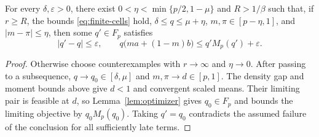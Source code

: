\begin{lemma}\label{lem:finite-approximation}
For every $\delta,\varepsilon>0$, there exist
$0<\eta<\min\{p/2,1-\mu\}$ and $R>1/\beta$ such
that, if $r\ge R$, the bounds \eqref{eq:finite-cells} hold,
$\delta\le q\le\mu+\eta$, $m,\pi\in[p-\eta,1]$, and
$|m-\pi|\le\eta$, then some $q'\in F_p$ satisfies
\[
 |q'-q|\le\varepsilon,\qquad
 q\bigl(ma+(1-m)b\bigr)\le q'M_p(q')+\varepsilon.
\]
\end{lemma}
\begin{proof}
Otherwise choose counterexamples with $r\to\infty$ and $\eta\to0$.
After passing to a subsequence, $q\to q_0\in[\delta,\mu]$ and
$m,\pi\to d\in[p,1]$. The density gap and moment bounds above give
$d<1$ and convergent scaled means. Their limiting pair is feasible
at $d$, so Lemma~\ref{lem:optimizer} gives $q_0\in F_p$ and bounds the
limiting objective by $q_0M_p(q_0)$. Taking $q'=q_0$ contradicts the
assumed failure of the conclusion for all sufficiently late terms.
\end{proof}

